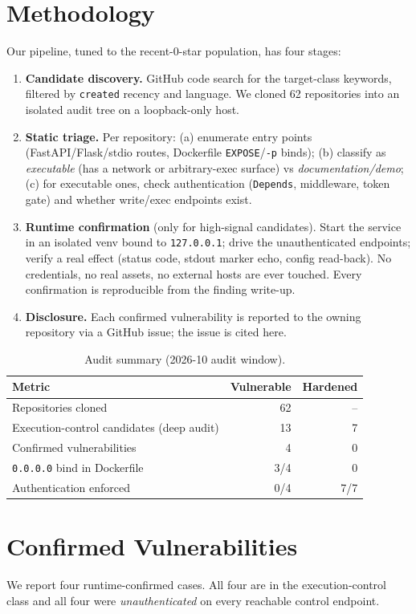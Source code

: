 \documentclass{llncs}
\begin{document}
\section{Methodology}\label{sec:method}
Our pipeline, tuned to the recent-0-star population, has four stages:
\begin{enumerate}
\item \textbf{Candidate discovery.} GitHub code search for the target-class keywords, filtered by \texttt{created} recency and language. We cloned 62 repositories into an isolated audit tree on a loopback-only host.
\item \textbf{Static triage.} Per repository: (a) enumerate entry points (FastAPI/Flask/stdio routes, Dockerfile \texttt{EXPOSE}/\texttt{-p} binds); (b) classify as \emph{executable} (has a network or arbitrary-exec surface) vs \emph{documentation/demo}; (c) for executable ones, check authentication (\texttt{Depends}, middleware, token gate) and whether write/exec endpoints exist.
\item \textbf{Runtime confirmation} (only for high-signal candidates). Start the service in an isolated venv bound to \texttt{127.0.0.1}; drive the unauthenticated endpoints; verify a real effect (status code, stdout marker echo, config read-back). No credentials, no real assets, no external hosts are ever touched. Every confirmation is reproducible from the finding write-up.
\item \textbf{Disclosure.} Each confirmed vulnerability is reported to the owning repository via a GitHub issue; the issue is cited here.
\end{enumerate}
\begin{table}[t]
\centering
\small
\caption{Audit summary (2026-10 audit window).\label{tab:summary}}
\begin{tabular}{lrr}
\toprule
Metric & Vulnerable & Hardened \\
\midrule
Repositories cloned & 62 & -- \\
Execution-control candidates (deep audit) & 13 & 7 \\
Confirmed vulnerabilities & 4 & 0 \\
\texttt{0.0.0.0} bind in Dockerfile & 3/4 & 0 \\
Authentication enforced & 0/4 & 7/7 \\
\bottomrule
\end{tabular}
\end{table}

\section{Confirmed Vulnerabilities}\label{sec:vulns}
We report four runtime-confirmed cases. All four are in the execution-control class and all four were \emph{unauthenticated} on every reachable control endpoint.
\end{document}
